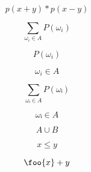 ﻿\documentclass{article}
\begin{document}
\[
p(x+y) * p(x-y)
\]

\[
\sum_{\omega_i\in A} P(\omega_i)
\]

\[
P(\omega_i)
\]

\[
\omega_i\in A
\]

\[
∑_{ωᵢ∈A} P(ωᵢ)
\]

\[
ωᵢ∈A
\]

\[
A∪B
\]

\[
x≤y
\]

\[
\foo{x}+y
\]
\end{document}

